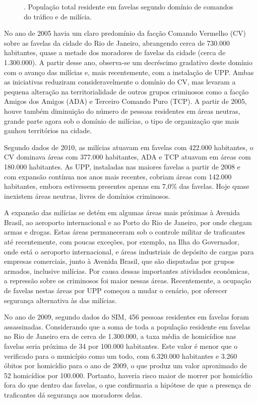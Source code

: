 \documentclass{article}
\begin{document}
\begin{figure}
\caption{. População total residente em favelas segundo domínio de comandos do
tráfico e de milícia.}
\end{figure}

No ano de 2005 havia um claro predomínio da facção Comando Vermelho (CV) sobre
as favelas da cidade do Rio de Janeiro, abrangendo cerca de 730.000 habitantes,
quase a metade dos moradores de favelas da cidade (cerca de 1.300.000). A partir
desse ano, observa-se um decréscimo gradativo deste domínio com o avanço das
milícias e, mais recentemente, com a instalação de UPP. Ambas as iniciativas
reduziram consideravelmente o domínio do CV, mas levaram a pequena alteração na
territorialidade de outros grupos criminosos como a facção Amigos dos Amigos
(ADA) e Terceiro Comando Puro (TCP). A partir de 2005, houve também diminuição
do número de pessoas residentes em áreas neutras, grande parte agora sob o
domínio de milícias, o tipo de organização que mais ganhou territórios na
cidade.

Segundo dados de 2010, as milícias atuavam em favelas com 422.000 habitantes, o
CV dominava áreas com 377.000 habitantes, ADA e TCP atuavam em áreas com 180.000
habitantes. As UPP, instaladas nas maiores favelas a partir de 2008 e com
expansão contínua nos anos mais recentes, cobriam áreas com 142.000 habitantes,
embora estivessem presentes apenas em 7,0\% das favelas. Hoje quase inexistem
áreas neutras, livres de domínios criminosos.

A expansão das milícias se detém em algumas áreas mais próximas à Avenida
Brasil, ao aeroporto internacional e ao Porto do Rio de Janeiro, por onde chegam
armas e drogas. Estas áreas permaneceram sob o controle militar de traficantes
até recentemente, com poucas exceções, por exemplo, na Ilha do Governador, onde
está o aeroporto internacional, e áreas industriais de depósito de cargas para
empresas comerciais, junto à Avenida Brasil, que são disputadas por grupos
armados, inclusive milícias. Por causa dessas importantes atividades econômicas,
a repressão sobre os criminosos foi maior nessas áreas. Recentemente, a ocupação
de favelas nestas áreas por UPP começou a mudar o cenário, por oferecer
segurança alternativa às das milícias.

No ano de 2009, segundo dados do SIM, 456 pessoas residentes em favelas foram
assassinadas. Considerando que a soma de toda a população residente em favelas
no Rio de Janeiro era de cerca de 1.300.000, a taxa média de homicídios nas
favelas seria próxima de 34 por 100.000 habitantes. Este valor é menor que o
verificado para o município como um todo, com 6.320.000 habitantes e 3.260
óbitos por homicídio para o ano de 2009, o que produz um valor aproximado de 52
homicídios por 100.000. Portanto, haveria risco maior de morrer por homicídio
fora do que dentro das favelas, o que confirmaria a hipótese de que a presença
de traficantes dá segurança aos moradores delas.
\end{document}
